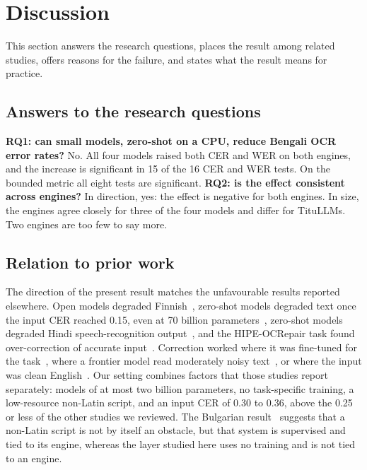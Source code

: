 \documentclass[conference]{IEEEtran}
\begin{document}
\section{Discussion}
\label{sec:discussion}

This section answers the research questions, places the result among related studies, offers reasons for the failure, and states what the result means for practice.

\subsection{Answers to the research questions}
\textbf{RQ1: can small models, zero-shot on a CPU, reduce Bengali OCR error rates?} No. All four models raised both CER and WER on both engines, and the increase is significant in 15 of the 16 CER and WER tests. On the bounded metric all eight tests are significant.
\textbf{RQ2: is the effect consistent across engines?} In direction, yes: the effect is negative for both engines. In size, the engines agree closely for three of the four models and differ for TituLLMs. Two engines are too few to say more.

\subsection{Relation to prior work}
The direction of the present result matches the unfavourable results reported elsewhere. Open models degraded Finnish~\cite{kanerva2025nofreelunches}, zero-shot models degraded text once the input CER reached 0.15, even at 70 billion parameters~\cite{koynov2025opportunities}, zero-shot models degraded Hindi speech-recognition output~\cite{kumar2026postasr}, and the HIPE-OCRepair task found over-correction of accurate input~\cite{ehrmann2026hipeocrepair}. Correction worked where it was fine-tuned for the task~\cite{thomas2024leveraging,ehrmann2026hipeocrepair}, where a frontier model read moderately noisy text~\cite{viana2026reframing}, or where the input was clean English~\cite{koynov2025opportunities}. Our setting combines factors that those studies report separately: models of at most two billion parameters, no task-specific training, a low-resource non-Latin script, and an input CER of 0.30 to 0.36, above the 0.25 or less of the other studies we reviewed. The Bulgarian result~\cite{beshirov2025bulgarian} suggests that a non-Latin script is not by itself an obstacle, but that system is supervised and tied to its engine, whereas the layer studied here uses no training and is not tied to an engine.
\end{document}
